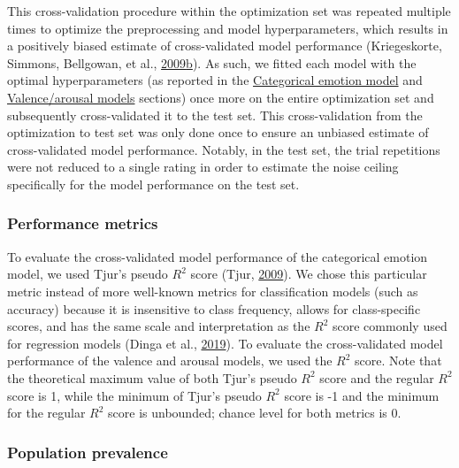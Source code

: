 \documentclass[11pt,american,]{memoir} %
\begin{document}
This cross-validation procedure within the optimization set was repeated multiple times to optimize the preprocessing and model hyperparameters, which results in a positively biased estimate of cross-validated model performance (Kriegeskorte, Simmons, Bellgowan, et al., \protect\hyperlink{ref-Kriegeskorte2009-yz}{2009}\protect\hyperlink{ref-Kriegeskorte2009-yz}{b}). As such, we fitted each model with the optimal hyperparameters (as reported in the \protect\hyperlink{svsd-cat-emo}{Categorical emotion model} and \protect\hyperlink{svsd-valaro}{Valence/arousal models} sections) once more on the entire optimization set and subsequently cross-validated it to the test set. This cross-validation from the optimization to test set was only done once to ensure an unbiased estimate of cross-validated model performance. Notably, in the test set, the trial repetitions were not reduced to a single rating in order to estimate the noise ceiling specifically for the model performance on the test set.

\hypertarget{svsd-perf}{%
\subsubsection{Performance metrics}\label{svsd-perf}}

To evaluate the cross-validated model performance of the categorical emotion model, we used Tjur's pseudo \(R^{2}\) score (Tjur, \protect\hyperlink{ref-Tjur2009-dp}{2009}). We chose this particular metric instead of more well-known metrics for classification models (such as accuracy) because it is insensitive to class frequency, allows for class-specific scores, and has the same scale and interpretation as the \(R^{2}\) score commonly used for regression models (Dinga et al., \protect\hyperlink{ref-Dinga2019-mh}{2019}). To evaluate the cross-validated model performance of the valence and arousal models, we used the \(R^{2}\) score. Note that the theoretical maximum value of both Tjur's pseudo \(R^{2}\) score and the regular \(R^{2}\) score is 1, while the minimum of Tjur's pseudo \(R^{2}\) score is -1 and the minimum for the regular \(R^{2}\) score is unbounded; chance level for both metrics is 0.

\hypertarget{population-prevalence}{%
\subsubsection{Population prevalence}\label{population-prevalence}}
\end{document}
